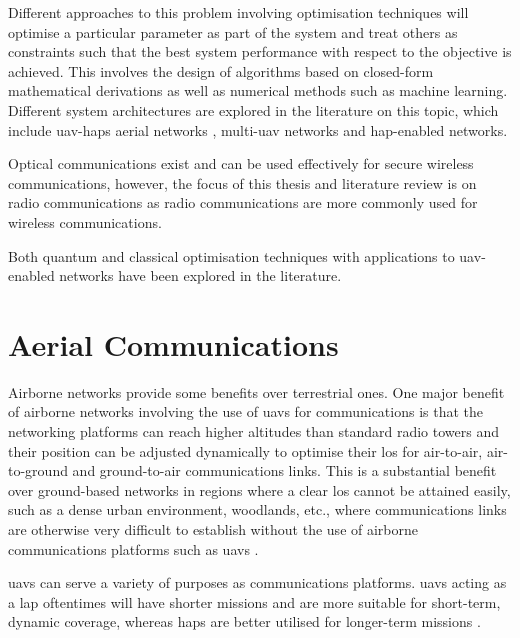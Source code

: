 Different approaches to this problem involving optimisation techniques will optimise a particular parameter as part of the system and treat others as constraints such that the best system performance with respect to the objective is achieved. 
This involves the design of algorithms based on closed-form mathematical derivations as well as numerical methods such as machine learning. 
Different system architectures are explored in the literature on this topic, which include \acrshort{uav}-\acrshort{hap}s aerial networks \cite{zhang_one_2025, ji_joint_2023, azizi_exploring_2024}, multi-\acrshort{uav} networks \cite{mu_security_2021, jeong_quantum_2025} and \acrshort{hap}-enabled networks. 

Optical communications exist and can be used effectively for secure wireless communications, however, the focus of this thesis and literature review is on radio communications as radio communications are more commonly used for wireless communications. 

Both quantum \cite{jeong_quantum_2025, silvirianti_layerwise_2024, li_intelligent_2021, saravanan_optimizing_2024} and classical optimisation techniques with applications to \acrshort{uav}-enabled networks have been explored in the literature. 

\section{Aerial Communications}
Airborne networks provide some benefits over terrestrial ones. One major benefit of airborne networks involving the use of \acrshort{uav}s for communications is that the networking platforms can reach higher altitudes than standard radio towers and their position can be adjusted dynamically to optimise their \acrfull{los} for air-to-air, air-to-ground and ground-to-air communications links. 
This is a substantial benefit over ground-based networks in regions where a clear \acrshort{los} cannot be attained easily, such as a dense urban environment, woodlands, etc., where communications links are otherwise very difficult to establish without the use of airborne communications platforms such as \acrshort{uav}s \cite{namuduri_uav_2017}.

\acrshort{uav}s can serve a variety of purposes as communications platforms. \acrshort{uav}s acting as a \acrfull{lap} oftentimes will have shorter missions and are more suitable for short-term, dynamic coverage, whereas \acrshort{hap}s are better utilised for longer-term missions \cite{namuduri_uav_2017}.

